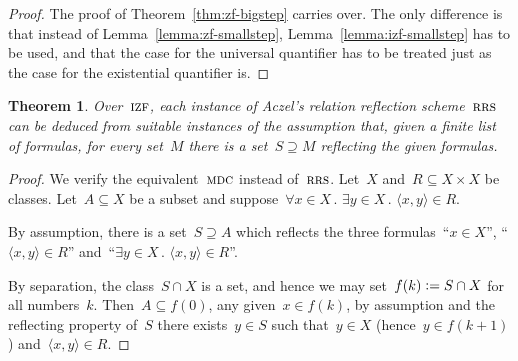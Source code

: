 \documentclass[oneside,reqno]{amsart}
\theoremstyle{definition}
\theoremstyle{plain}
\newtheorem{thm}[defn]{Theorem}
\theoremstyle{remark}
\newcommand{\defeq}{\vcentcolon=}
\renewcommand{\_}{\mathpunct{.}\,}
\newcommand{\?}{\,{:}\,}
\newcommand{\IZF}{\textsc{izf}}
\newcommand{\RRS}{\textsc{rrs}}
\newcommand{\MDC}{\textsc{mdc}}
\begin{document}
\begin{proof}The proof of Theorem~\ref{thm:zf-bigstep} carries over. The only
difference is that instead of Lemma~\ref{lemma:zf-smallstep},
Lemma~\ref{lemma:izf-smallstep} has to be used, and that the case for the
universal quantifier has to be treated just as the case for the existential
quantifier is.\end{proof}

\begin{thm}\label{thm:refl-entails-rrs}
Over~$\IZF$, each instance of Aczel's relation reflection scheme~$\RRS$ can be
deduced from suitable instances of the assumption that, given a finite list
of formulas, for every set~$M$ there is a set~$S \supseteq M$ reflecting the
given formulas.
\end{thm}

\begin{proof}We verify the equivalent~$\MDC$ instead of~$\RRS$. Let~$X$ and~$R
\subseteq X \times X$ be classes. Let~$A \subseteq X$ be a subset and
suppose~$\forall x \in X\_ \exists y \in X\_ \langle x,y \rangle \in R$.

By assumption, there is a set~$S \supseteq A$ which reflects the three
formulas~``$x \in X$'', ``$\langle x,y \rangle \in R$'' and~``$\exists y \in X\_ \langle
x,y \rangle \in R$''.

By separation, the class~$S \cap X$ is a set, and hence we may set~$f(k) \defeq S \cap X$
for all numbers~$k$. Then~$A \subseteq f(0)$, any given~$x \in f(k)$, by
assumption and the reflecting property of~$S$ there exists~$y \in S$ such
that~$y \in X$ (hence~$y \in f(k+1)$) and~$\langle x,y \rangle \in R$.
\end{proof}
\end{document}
